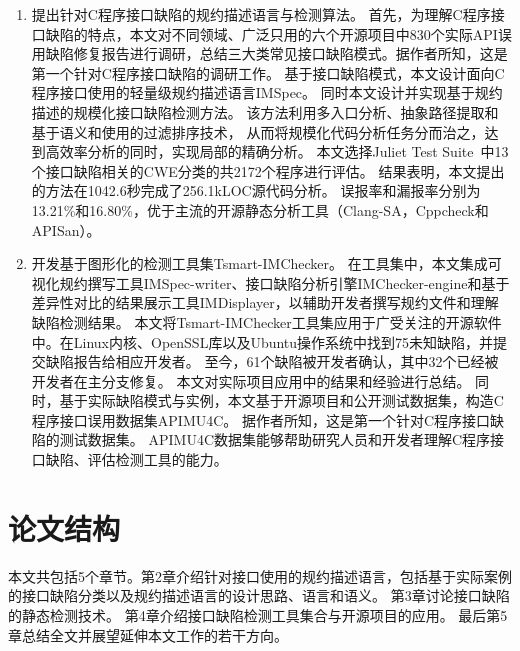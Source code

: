 \begin{enumerate}
	\item 提出针对C程序接口缺陷的规约描述语言与检测算法。
	首先，为理解C程序接口缺陷的特点，本文对不同领域、广泛只用的六个开源项目中830个实际API误用缺陷修复报告进行调研，总结三大类常见接口缺陷模式。据作者所知，这是第一个针对C程序接口缺陷的调研工作。
	基于接口缺陷模式，本文设计面向C程序接口使用的轻量级规约描述语言IMSpec。
	同时本文设计并实现基于规约描述的规模化接口缺陷检测方法。
	该方法利用多入口分析、抽象路径提取和基于语义和使用的过滤排序技术，
	从而将规模化代码分析任务分而治之，达到高效率分析的同时，实现局部的精确分析。
	本文选择Juliet Test Suite~\cite{juliet}中13个接口缺陷相关的CWE分类的共2172个程序进行评估。
	结果表明，本文提出的方法在1042.6秒完成了256.1kLOC源代码分析。
	误报率和漏报率分别为13.21\%和16.80\%，优于主流的开源静态分析工具（Clang-SA，Cppcheck和APISan）。
	
	\item 开发基于图形化的检测工具集Tsmart-IMChecker。
	在工具集中，本文集成可视化规约撰写工具IMSpec-writer、接口缺陷分析引擎IMChecker-engine和基于差异性对比的结果展示工具IMDisplayer，以辅助开发者撰写规约文件和理解缺陷检测结果。
	本文将Tsmart-IMChecker工具集应用于广受关注的开源软件中。在Linux内核、OpenSSL库以及Ubuntu操作系统中找到75未知缺陷，并提交缺陷报告给相应开发者。
	至今，61个缺陷被开发者确认，其中32个已经被开发者在主分支修复。
	本文对实际项目应用中的结果和经验进行总结。
	同时，基于实际缺陷模式与实例，本文基于开源项目和公开测试数据集，构造C程序接口误用数据集APIMU4C。
	据作者所知，这是第一个针对C程序接口缺陷的测试数据集。
	APIMU4C数据集能够帮助研究人员和开发者理解C程序接口缺陷、评估检测工具的能力。
	
	
\end{enumerate}
\section{论文结构}
本文共包括5个章节。第2章介绍针对接口使用的规约描述语言，包括基于实际案例的接口缺陷分类以及规约描述语言的设计思路、语言和语义。
第3章讨论接口缺陷的静态检测技术。
第4章介绍接口缺陷检测工具集合与开源项目的应用。
最后第5章总结全文并展望延伸本文工作的若干方向。

